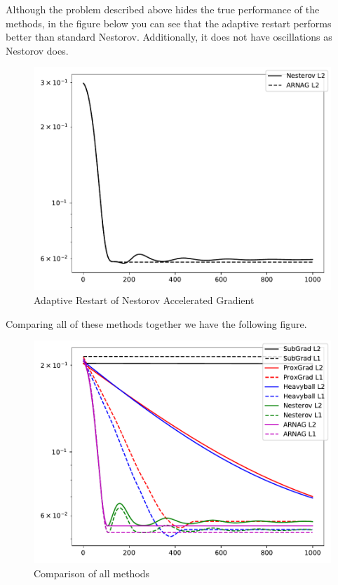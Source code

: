 \documentclass[11pt, answers]{exam}
\begin{document}
\begin{questions}
\begin{solution}
	Although the problem described above hides the true performance of the methods, in the figure below you can see that the adaptive restart performs better than standard Nestorov. Additionally, it does not have oscillations as Nestorov does.
	
		\begin{figure}[H]
		\centering
		\includegraphics[width=.75\textwidth]{../out/ARNAG.pdf}
		\caption{Adaptive Restart of Nestorov Accelerated Gradient}
		\end{figure}
	
	
	Comparing all of these methods together we have the following figure.
	
		\begin{figure}[H]
		\centering
		\includegraphics[width=.75\textwidth]{../out/error.pdf}
		\caption{Comparison of all methods}
		\end{figure}
	\end{solution}


\end{questions}

\pagebreak

\appendix
\end{document}
